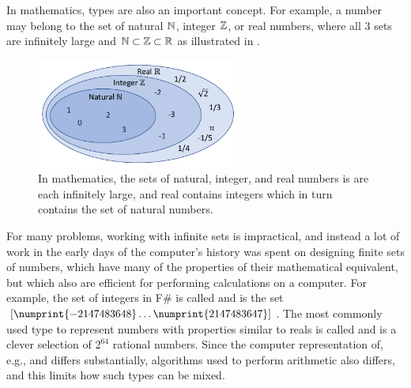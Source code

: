 \documentclass[springer.tex]{subfiles}
\begin{document}
In mathematics, types are also an important concept. For example, a number may belong to the set of natural $\mathbb{N}$, integer $\mathbb{Z}$, or real numbers, where all 3 sets are infinitely large and $\mathbb{N}\subset\mathbb{Z}\subset\mathbb{R}$ as illustrated in .
\begin{figure} %
  \centering
  \includegraphics[width=0.6\textwidth]{numbers}
  \caption{In mathematics, the sets of natural, integer, and real numbers is are each infinitely large, and real contains integers which in turn contains the set of natural numbers.}
  \label{fig:numbers}
\end{figure}
For many problems, working with infinite sets is impractical, and instead a lot of work in the early days of the computer's history was spent on designing finite sets of numbers, which have many of the properties of their mathematical equivalent, but which also are efficient for performing calculations on a computer. For example, the set of integers in F\# is called  and is the set $[\numprint{-2147483648} \ldots \numprint{2147483647}]$. The most commonly used type to represent numbers with properties similar to reals is called  and is a clever selection of $2^{64}$ rational numbers. Since the computer representation of, e.g.,  and  differs substantially, algorithms used to perform arithmetic also differs, and this limits how such types can be mixed.
\end{document}
